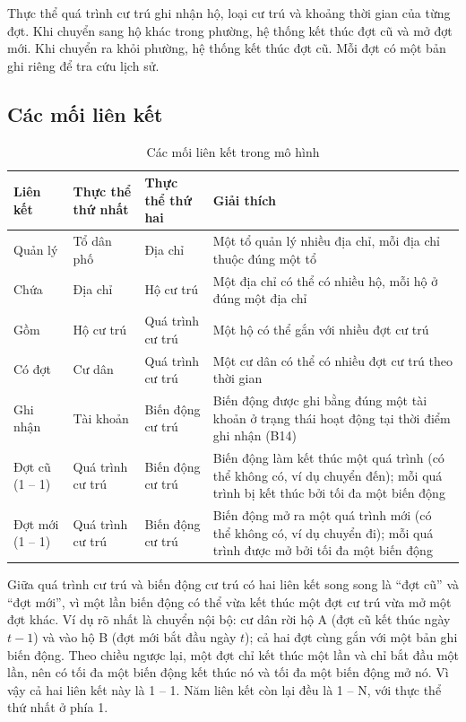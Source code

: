 Thực thể quá trình cư trú ghi nhận hộ, loại cư trú và khoảng thời gian của từng đợt. Khi chuyển sang hộ khác trong phường, hệ thống kết thúc đợt cũ và mở đợt mới. Khi chuyển ra khỏi phường, hệ thống kết thúc đợt cũ. Mỗi đợt có một bản ghi riêng để tra cứu lịch sử.

\subsection{Các mối liên kết}
\label{subsec:lienket}

\begin{table}[H]
\centering
\fontsize{12pt}{16pt}\selectfont
\renewcommand{\arraystretch}{1.15}
\begin{tabularx}{\textwidth}{|P{2.0cm}|P{2.5cm}|P{2.5cm}|Y|}
\hline
\textbf{Liên kết} & \textbf{Thực thể thứ nhất} & \textbf{Thực thể thứ hai} & \textbf{Giải thích} \\
\hline
Quản lý & Tổ dân phố & Địa chỉ & Một tổ quản lý nhiều địa chỉ, mỗi địa chỉ thuộc đúng một tổ \\
\hline
Chứa & Địa chỉ & Hộ cư trú & Một địa chỉ có thể có nhiều hộ, mỗi hộ ở đúng một địa chỉ \\
\hline
Gồm & Hộ cư trú & Quá trình cư trú & Một hộ có thể gắn với nhiều đợt cư trú \\
\hline
Có đợt & Cư dân & Quá trình cư trú & Một cư dân có thể có nhiều đợt cư trú theo thời gian \\
\hline
Ghi nhận & Tài khoản & Biến động cư trú & Biến động được ghi bằng đúng một tài khoản ở trạng thái hoạt động tại thời điểm ghi nhận (B14) \\
\hline
Đợt cũ (1 -- 1) & Quá trình cư trú & Biến động cư trú & Biến động làm kết thúc một quá trình (có thể không có, ví dụ chuyển đến); mỗi quá trình bị kết thúc bởi tối đa một biến động \\
\hline
Đợt mới (1 -- 1) & Quá trình cư trú & Biến động cư trú & Biến động mở ra một quá trình mới (có thể không có, ví dụ chuyển đi); mỗi quá trình được mở bởi tối đa một biến động \\
\hline
\end{tabularx}
\caption{Các mối liên kết trong mô hình}
\label{tab:lienket}
\end{table}

Giữa quá trình cư trú và biến động cư trú có hai liên kết song song là ``đợt cũ'' và ``đợt mới'', vì một lần biến động có thể vừa kết thúc một đợt cư trú vừa mở một đợt khác. Ví dụ rõ nhất là chuyển nội bộ: cư dân rời hộ A (đợt cũ kết thúc ngày $t-1$) và vào hộ B (đợt mới bắt đầu ngày $t$); cả hai đợt cùng gắn với một bản ghi biến động. Theo chiều ngược lại, một đợt chỉ kết thúc một lần và chỉ bắt đầu một lần, nên có tối đa một biến động kết thúc nó và tối đa một biến động mở nó. Vì vậy cả hai liên kết này là 1 -- 1. Năm liên kết còn lại đều là 1 -- N, với thực thể thứ nhất ở phía 1.

